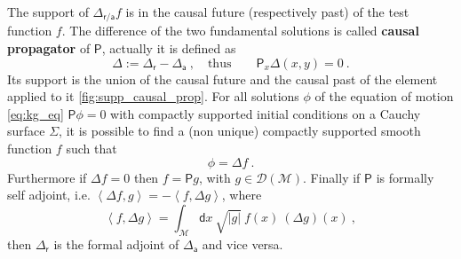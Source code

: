 \documentclass[11pt]{book}
\newcommand{\abs}[1]{\left|#1\right|}
\newcommand{\sm}[1]{\left\langle#1\right\rangle}
\newcommand{\Dcal}{\mathcal{D}}
\newcommand{\Mcal}{\mathcal{M}}
\newcommand{\Psf}{\mathsf{P}}
\newcommand{\asf}{\mathsf{a}}
\newcommand{\dsf}{\mathsf{d}}
\newcommand{\rsf}{\mathsf{r}}
\theoremstyle{break}
\begin{document}
The support of $\Delta_{\mathsf{\rsf/\asf}} f$ is in the causal future (respectively past) of the test function $f$. The difference of the two fundamental solutions is called \textbf{causal propagator} of $\Psf$, actually it is defined as
%
\begin{equation*}
\Delta := \Delta_\rsf - \Delta_\asf \ , \quad \mbox{thus} \qquad \Psf_x \Delta(x,y) = 0 \ .
\end{equation*}
%
Its support is the union of the causal future and the causal past of the element applied to it \ref{fig:supp_causal_prop}. For all solutions $\phi$ of the equation of motion \eqref{eq:kg_eq} $\Psf \phi =0$ with compactly supported initial conditions on a Cauchy surface $\Sigma$, it is possible to find \cite{baer_wave_2008} a (non unique) compactly supported smooth function $f$ such that
%
\begin{equation}
\phi = \Delta f \ . 
\label{eq:sol_express_prop}
\end{equation}
%
Furthermore if $\Delta f = 0$ then  $f = \Psf g$, with $g\in\Dcal(\Mcal)$. Finally if $\Psf$ is formally self adjoint, i.e. $\sm{\Delta f,g} = - \sm{f,\Delta g}$, where
%
\begin{equation}
\sm{f,\Delta g} = \int_\Mcal \dsf x \ \sqrt{\abs{g}} \ f(x) \ \left(\Delta g\right)(x) \ , 
\label{eq:smearing}
\end{equation}
%
then $\Delta_\rsf$ is the formal adjoint of $\Delta_\asf$ and vice versa.


\bigskip
\end{document}
